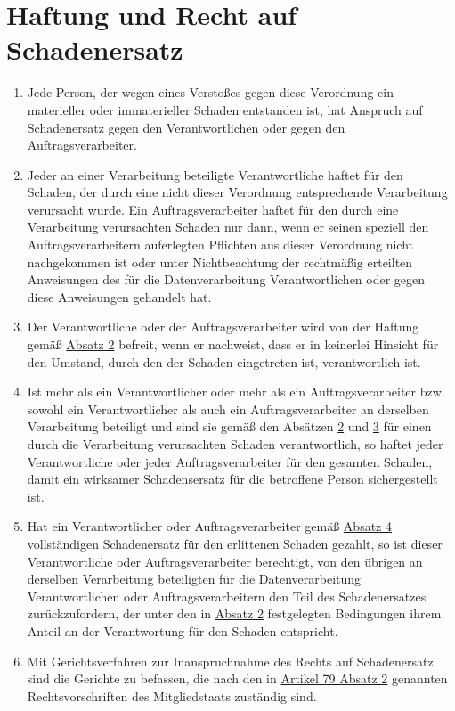 \chapter{Haftung und Recht auf Schadenersatz}
\label{ch:82}


\begin{enumerate}

  \item Jede Person, der wegen eines Verstoßes gegen diese Verordnung ein materieller oder immaterieller Schaden
   entstanden ist, hat Anspruch auf Schadenersatz gegen den Verantwortlichen oder gegen den Auftragsverarbeiter.
  \label{itm:82-1}

  \item Jeder an einer Verarbeitung beteiligte Verantwortliche haftet für den Schaden, der durch eine nicht dieser
   Verordnung entsprechende Verarbeitung verursacht wurde. Ein Auftragsverarbeiter haftet für den durch eine
   Verarbeitung verursachten Schaden nur dann, wenn er seinen speziell den Auftragsverarbeitern auferlegten Pflichten
   aus dieser Verordnung nicht nachgekommen ist oder unter Nichtbeachtung der rechtmäßig erteilten Anweisungen des für
   die Datenverarbeitung Verantwortlichen oder gegen diese Anweisungen gehandelt hat.
  \label{itm:82-2}

  \item Der Verantwortliche oder der Auftragsverarbeiter wird von der Haftung gemäß \hyperref[itm:82-2]{Absatz 2}
   befreit, wenn er nachweist, dass er in keinerlei Hinsicht für den Umstand, durch den der Schaden eingetreten ist,
   verantwortlich ist.
  \label{itm:82-3}

  \item Ist mehr als ein Verantwortlicher oder mehr als ein Auftragsverarbeiter bzw. sowohl ein Verantwortlicher als
   auch ein Auftragsverarbeiter an derselben Verarbeitung beteiligt und sind sie gemäß den Absätzen \hyperref[itm:82-2]
   {2} und \hyperref[itm:82-3]{3} für einen durch die Verarbeitung verursachten Schaden verantwortlich, so haftet jeder
   Verantwortliche oder jeder Auftragsverarbeiter für den gesamten Schaden, damit ein wirksamer Schadensersatz für die
   betroffene Person sichergestellt ist.
  \label{itm:82-4}

  \item Hat ein Verantwortlicher oder Auftragsverarbeiter gemäß \hyperref[itm:82-4]{Absatz 4} vollständigen
   Schadenersatz für den erlittenen Schaden gezahlt, so ist dieser Verantwortliche oder Auftragsverarbeiter berechtigt,
   von den übrigen an derselben Verarbeitung beteiligten für die Datenverarbeitung Verantwortlichen oder
   Auftragsverarbeitern den Teil des Schadenersatzes zurückzufordern, der unter den in \hyperref[itm:82-2]{Absatz 2}
   festgelegten Bedingungen ihrem Anteil an der Verantwortung für den Schaden entspricht.
  \label{itm:82-5}

  \item Mit Gerichtsverfahren zur Inanspruchnahme des Rechts auf Schadenersatz sind die Gerichte zu befassen, die nach
   den in \hyperref[itm:79-2]{Artikel 79 Absatz 2} genannten Rechtsvorschriften des Mitgliedstaats zuständig sind.
  \label{itm:82-6}

\end{enumerate}



